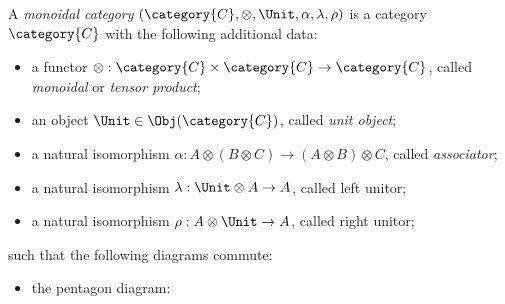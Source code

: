 \documentclass[DIN, pagenumber=false, fontsize=11pt, parskip=half, colorinlistoftodos, svgnames]{scrartcl}
\begin{document}
	
	\begin{definition}
		\label{def: monoCat}
		A \emph{monoidal category} $(\category{C}, \otimes, \Unit, \alpha, \lambda, \rho)$ is a category $\category{C}$ with the following additional data:
		\begin{itemize}
			\item 
				a functor $\otimes : \category{C} \times \category{C} \rightarrow \category{C} $, called \emph{monoidal} or \emph{tensor product};
			\item 
				an object $\Unit \in  \Obj(\category{C})$, called \emph{unit object};
			\item 
				a natural isomorphism $\alpha: A \otimes (B \otimes C ) \rightarrow (A \otimes B) \otimes C$, called \emph{associator};
			\item 
				a natural isomorphism $\lambda: \Unit \otimes A \rightarrow A$, called left unitor;
			\item 
				a natural isomorphism $\rho: A \otimes \Unit \rightarrow A$, called right unitor;
		\end{itemize}
		such that the following diagrams commute:
		\begin{itemize}
			\item the pentagon diagram: 
			\begin{center}
			\end{center}
			

\end{itemize}
\end{definition}
\end{document}
